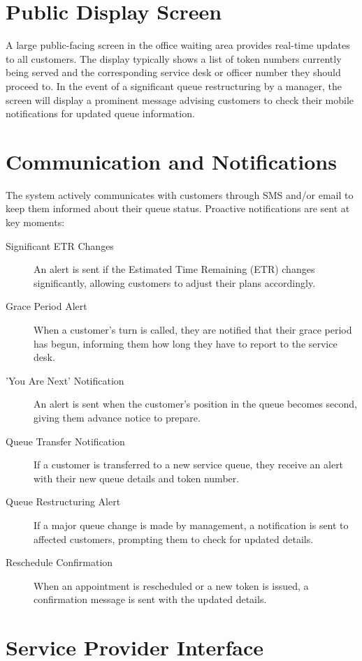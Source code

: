 \documentclass{article}
\begin{document}
\section{Public Display Screen}

A large public-facing screen in the office waiting area provides real-time updates to all customers. The display typically shows a list of token numbers currently being served and the corresponding service desk or officer number they should proceed to. In the event of a significant queue restructuring by a manager, the screen will display a prominent message advising customers to check their mobile notifications for updated queue information.

\section{Communication and Notifications}

The system actively communicates with customers through SMS and/or email to keep them informed about their queue status. Proactive notifications are sent at key moments:

\begin{description}
    \item[Significant ETR Changes] An alert is sent if the Estimated Time Remaining (ETR) changes significantly, allowing customers to adjust their plans accordingly.
    \item[Grace Period Alert] When a customer's turn is called, they are notified that their grace period has begun, informing them how long they have to report to the service desk.
    \item['You Are Next' Notification] An alert is sent when the customer's position in the queue becomes second, giving them advance notice to prepare.
    \item[Queue Transfer Notification] If a customer is transferred to a new service queue, they receive an alert with their new queue details and token number.
    \item[Queue Restructuring Alert] If a major queue change is made by management, a notification is sent to affected customers, prompting them to check for updated details.
    \item[Reschedule Confirmation] When an appointment is rescheduled or a new token is issued, a confirmation message is sent with the updated details.
\end{description}

\section{Service Provider Interface}
\end{document}
